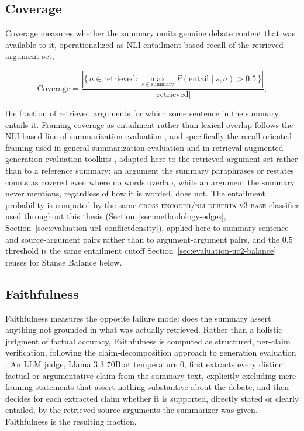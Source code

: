 \subsection{Coverage}
\label{sec:evaluation-uc2-coverage}

Coverage measures whether the summary omits genuine debate content that was available to it,
operationalized as NLI-entailment-based recall of the retrieved argument set,

\begin{equation}
\mathrm{Coverage} = \frac{\left| \{\, a \in \text{retrieved} : \max_{s \in \text{summary}}
P(\text{entail} \mid s, a) > 0.5 \,\} \right|}{|\text{retrieved}|},
\label{eq:evaluation-coverage}
\end{equation}

\noindent the fraction of retrieved arguments for which some sentence in the summary entails it.
Framing coverage as entailment rather than lexical overlap follows the NLI-based line of
summarization evaluation \cite{laban2022summac}, and specifically the recall-oriented framing used
in general summarization evaluation \cite{fabbri2021summeval} and in retrieval-augmented generation
evaluation toolkits \cite{es2024ragas}, adapted here to the retrieved-argument set rather than to a
reference summary: an argument the summary paraphrases or restates counts as covered even where no
words overlap, while an argument the summary never mentions, regardless of how it is worded,
does not. The entailment probability is computed by the same \textsc{cross-encoder/nli-deberta-v3-base}
classifier used throughout this thesis (Section~\ref{sec:methodology-edges},
Section~\ref{sec:evaluation-uc1-conflictdensity}), applied here to summary-sentence and
source-argument pairs rather than to argument-argument pairs, and the $0.5$ threshold is the same
entailment cutoff Section~\ref{sec:evaluation-uc2-balance} reuses for Stance Balance below.

\subsection{Faithfulness}
\label{sec:evaluation-uc2-faithfulness}

Faithfulness measures the opposite failure mode: does the summary assert anything not grounded in
what was actually retrieved. Rather than a holistic judgment of factual accuracy, Faithfulness is
computed as structured, per-claim verification, following the claim-decomposition approach to
generation evaluation \cite{liu2023geval,es2024ragas}. An LLM judge, Llama 3.3 70B at temperature 0,
first extracts every distinct factual or argumentative claim from the summary text, explicitly
excluding mere framing statements that assert nothing substantive about the debate, and then decides
for each extracted claim whether it is supported, directly stated or clearly entailed, by the
retrieved source arguments the summarizer was given. Faithfulness is the resulting fraction,

